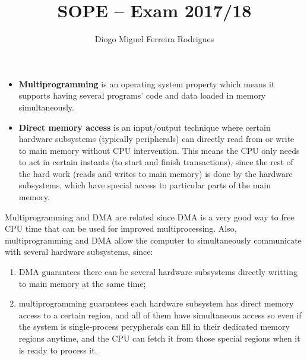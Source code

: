 \documentclass{sope}
\title{SOPE -- Exam 2017/18}
\author{Diogo Miguel Ferreira Rodrigues \\ \email{dmfrodrigues2000@gmail.com}}
\begin{document}
\setcounter{chapter}{17}
\begin{itemize}
    \item \textbf{Multiprogramming} is an operating system property which means it supports having several programs' code and data loaded in memory simultaneously.
    \item \textbf{Direct memory access} is an input/output technique where certain hardware subsystems (typically peripherals) can directly read from or write to main memory without CPU intervention. This means the CPU only needs to act in certain instants (to start and finish transactions), since the rest of the hard work (reads and writes to main memory) is done by the hardware subsystems, which have special access to particular parts of the main memory.
\end{itemize}
Multiprogramming and DMA are related since DMA is a very good way to free CPU time that can be used for improved multiprocessing. Also, multiprogramming and DMA allow the computer to simultaneously communicate with several hardware subsystems, since:
\begin{enumerate}
    \item DMA guarantees there can be several hardware subsystems directly writting to main memory at the same time;
    \item multiprogramming guarantees each hardware subsystem has direct memory access to a certain region, and all of them have simultaneous access so even if the system is single-process perypherals can fill in their dedicated memory regions anytime, and the CPU can fetch it from those special regions when it is ready to process it.
\end{enumerate}
\end{document}
